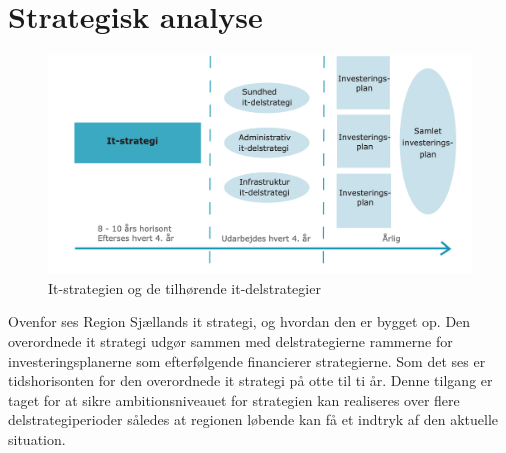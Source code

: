 \section{Strategisk analyse}
\begin{figure}[H]
	\centering
	\includegraphics[width=\linewidth]{Materials/Strategy}
	\caption{It-strategien og de tilhørende it-delstrategier}
\end{figure}
Ovenfor ses Region Sjællands it strategi, og hvordan den er bygget op. Den overordnede it strategi udgør sammen med delstrategierne rammerne for investeringsplanerne som efterfølgende financierer strategierne. Som det ses er tidshorisonten for den overordnede it strategi på otte til ti år. Denne tilgang er taget for at sikre ambitionsniveauet for strategien kan realiseres over flere delstrategiperioder således at regionen løbende kan få et indtryk af den aktuelle situation.
